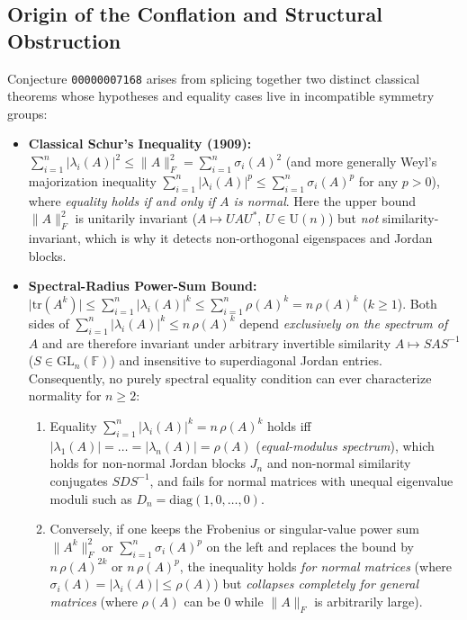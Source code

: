 \documentclass[11pt,a4paper]{article}
\theoremstyle{plain}
\theoremstyle{definition}
\newcommand{\tr}{\mathrm{tr}}
\newcommand{\diag}{\mathrm{diag}}
\newcommand{\GL}{\mathrm{GL}}
\newcommand{\Un}{\mathrm{U}}
\begin{document}
\subsection{Origin of the Conflation and Structural Obstruction}
Conjecture \texttt{00000007168} arises from splicing together two distinct classical theorems whose hypotheses and equality cases live in incompatible symmetry groups:
\begin{itemize}
  \item \textbf{Classical Schur's Inequality (1909):} $\sum_{i=1}^n |\lambda_i(A)|^2 \le \|A\|_F^2 = \sum_{i=1}^n \sigma_i(A)^2$ (and more generally Weyl's majorization inequality $\sum_{i=1}^n |\lambda_i(A)|^p \le \sum_{i=1}^n \sigma_i(A)^p$ for any $p > 0$), where \emph{equality holds if and only if $A$ is normal}. Here the upper bound $\|A\|_F^2$ is unitarily invariant ($A \mapsto U A U^*$, $U \in \Un(n)$) but \emph{not} similarity-invariant, which is why it detects non-orthogonal eigenspaces and Jordan blocks.
  \item \textbf{Spectral-Radius Power-Sum Bound:} $\bigl|\tr(A^k)\bigr| \le \sum_{i=1}^n |\lambda_i(A)|^k \le \sum_{i=1}^n \rho(A)^k = n\,\rho(A)^k$ ($k \ge 1$). Both sides of $\sum_{i=1}^n |\lambda_i(A)|^k \le n\,\rho(A)^k$ depend \emph{exclusively on the spectrum of $A$} and are therefore invariant under arbitrary invertible similarity $A \mapsto S A S^{-1}$ ($S \in \GL_n(\mathbb{F})$) and insensitive to superdiagonal Jordan entries. Consequently, no purely spectral equality condition can ever characterize normality for $n \ge 2$:
  \begin{enumerate}
    \item[(a)] Equality $\sum_{i=1}^n |\lambda_i(A)|^k = n\,\rho(A)^k$ holds iff $|\lambda_1(A)| = \dots = |\lambda_n(A)| = \rho(A)$ (\emph{equal-modulus spectrum}), which holds for non-normal Jordan blocks $J_n$ and non-normal similarity conjugates $S D S^{-1}$, and fails for normal matrices with unequal eigenvalue moduli such as $D_n = \diag(1,0,\dots,0)$.
    \item[(b)] Conversely, if one keeps the Frobenius or singular-value power sum $\|A^k\|_F^2$ or $\sum_{i=1}^n \sigma_i(A)^p$ on the left and replaces the bound by $n\,\rho(A)^{2k}$ or $n\,\rho(A)^p$, the inequality holds \emph{for normal matrices} (where $\sigma_i(A) = |\lambda_i(A)| \le \rho(A)$) but \emph{collapses completely for general matrices} (where $\rho(A)$ can be $0$ while $\|A\|_F$ is arbitrarily large).
  \end{enumerate}
\end{itemize}
\end{document}
